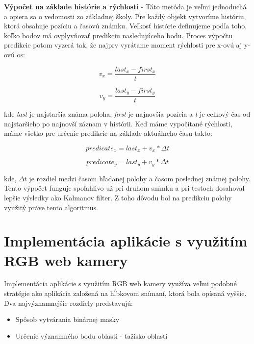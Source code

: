 \textbf{Výpočet na základe histórie a rýchlosti} - Táto metóda je veľmi jednoduchá a opiera sa o vedomosti zo základnej školy. Pre každý objekt vytvoríme históriu, ktorá obsahuje pozíciu a časovú známku. Veľkosť histórie definujeme podľa toho, koľko bodov má ovplyvňovať predikciu nasledujúceho bodu. Proces výpočtu predikcie potom vyzerá tak, že najprv vyrátame moment rýchlosti pre x-ovú aj y-ovú os: 

\begin{figure}[H]
  \centering
  \begin{minipage}[b]{0.45\textwidth}
    $$v_x = \frac{last_x - first_x} {t} $$ 
  \end{minipage}
  \hfill
  \begin{minipage}[b]{0.4\textwidth}
    $$v_y = \frac{last_y - first_y} {t} $$ 
  \end{minipage}
\end{figure}
kde \textit{last} je najstaršia známa poloha, \textit{first} je najnovšia pozícia a \textit{t} je celkový čas od najstaršieho po najnovší záznam v histórii. Keď máme vypočítané rýchlosti, máme všetko pre určenie predikcie na základe aktuálneho času takto: 

\begin{figure}[H]
  \centering
  \begin{minipage}[b]{0.45\textwidth}
    $$predicate_x = last_x + v_x * \Delta t $$ 
  \end{minipage}
  \hfill
  \begin{minipage}[b]{0.4\textwidth}
     $$predicate_y = last_y + v_y * \Delta t $$ 
  \end{minipage}
\end{figure}
kde, $\Delta t$ je rozdiel medzi časom hľadanej polohy a časom poslednej známej polohy. Tento výpočet funguje spoľahlivo už pri druhom snímku a pri testoch dosahoval lepšie výsledky ako Kalmanov filter. Z toho dôvodu bol na predikciu polohy využitý práve tento algoritmus. 

\section{Implementácia aplikácie s využitím RGB web kamery}
Implementácia aplikácie s využitím RGB web kamery využíva veľmi podobné stratégie ako aplikácia založená na hĺbkovom snímaní, ktorá bola opísaná vyššie. Dva najvýznamnejšie rozdiely predstavujú:
\begin{itemize}
\item Spôsob vytvárania binárnej masky
\item Určenie významného bodu oblasti - ťažisko oblasti
\end{itemize}

